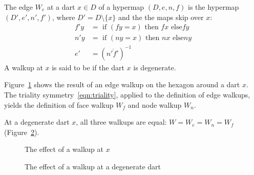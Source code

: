 \begin{definition}
The edge 
$W_e$ at  a dart $x\in D$ of a hypermap $(D,e,n,f)$ is the hypermap
$(D',e',n',f')$, where $D' = D\setminus\{x\}$ and the
the maps skip over $x$:
\begin{displaymath}
\begin{array}{lll}
f' y &= \text{ if } (f y =  x) \text{ then } f x \text{ else
} f y\\
n' y &= \text{ if } (n y = x) \text{ then } n x \text{ else
} n y\\
e' &= (n'\ocirc f')^{-1}
\end{array}
\end{displaymath}
A walkup at $x$ is said to be  if the dart $x$ is
degenerate.  
%
%
%
%
%
\end{definition}

Figure~\ref{fig:walk} shows
the result of an edge walkup on the hexagon around a dart $x$.
The triality symmetry~\ref{eqn:triality}, applied to the definition
of edge walkups, yields the definition of
face walkup $W_f$ and node walkup $W_n$.  

At a degenerate dart $x$, all three walkups are equal:
$W=W_e=W_n=W_f$ (Figure~\ref{fig:walkdegen}).
%
%

\begin{figure}[htb]
\centering
{}
\caption{The effect of a walkup at $x$}
\label{fig:walk}
\end{figure}


\begin{figure}[htb]
\centering
{}
\caption{The effect of a walkup at a degenerate dart}
\label{fig:walkdegen}
\end{figure}


